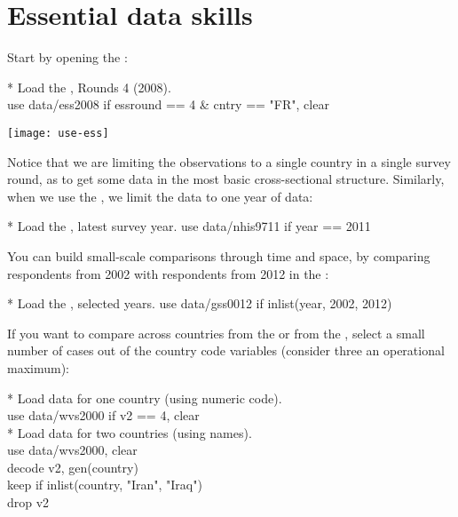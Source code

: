 %
%
\section{Essential data skills}

   Start by opening the \ess:\\[1em]

		\begin{docspec}
			* Load the \ess, Rounds 4 (2008).\\
			use data/ess2008 if essround == 4 \& cntry == "FR", clear
    \end{docspec}
    
		\texttt{[image: use-ess]}

  Notice that we are limiting the observations to a single country in a single survey round, as to get some data in the most basic cross-sectional structure. Similarly, when we use the \nhis, we limit the data to one year of data:%
  
    \begin{docspec}
      * Load the \nhis, latest survey year.
      use data/nhis9711 if year == 2011
    \end{docspec}
    
  You can build small-scale comparisons through time and space, \eg by comparing respondents from 2002 with respondents from 2012 in the \gss:%
  
    \begin{docspec}
      * Load the \gss, selected years.
      use data/gss0012 if inlist(year, 2002, 2012)
    \end{docspec}
    
  If you want to compare across countries from the \wvs or from the \ess, select a small number of cases out of the country code variables (consider three an operational maximum):%
  
    \begin{docspec}
      * Load data for one country (using numeric code).\\%
    	use data/wvs2000 if v2 == 4, clear\\[1em]%
      * Load data for two countries (using names).\\%
      use data/wvs2000, clear\\%
      decode v2, gen(country)\\%
      keep if inlist(country, "Iran", "Iraq")\\%
      drop v2%
    \end{docspec}
    
